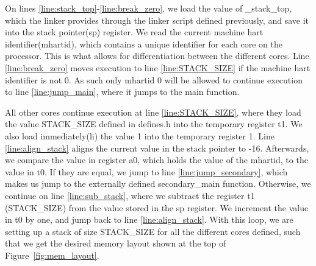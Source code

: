 On lines \ref{line:stack_top}-\ref{line:break_zero}, we load the value of
\_stack\_top, which the linker provides through the linker script defined
previously, and save it into the stack pointer(sp) register. We read the current
machine hart identifier(mhartid), which contains a unique identifier for each
core on the processor. This is what allows for differentiation between the
different cores. Line \ref{line:break_zero} moves execution to line
\ref{line:STACK_SIZE} if the machine hart identifier is not 0. As such only
mhartid 0 will be allowed to continue execution to line \ref{line:jump_main},
where it jumps to the main function.

All other cores continue execution at line \ref{line:STACK_SIZE}, where they
load the value STACK\_SIZE defined in defines.h into the temporary register t1.
We also load immediately(li) the value 1 into the temporary register 1. Line
\ref{line:align_stack} aligns the current value in the stack pointer to -16.
Afterwards, we compare the value in register a0, which holds the value of the
mhartid, to the value in t0. If they are equal, we jump to line
\ref{line:jump_secondary}, which makes us jump to the externally defined
secondary\_main function. Otherwise, we continue on line \ref{line:sub_stack},
where we subtract the register t1 (STACK\_SIZE) from the value stored in the sp
register. We increment the value in t0 by one, and jump back to line
\ref{line:align_stack}. With this loop, we are setting up a stack of size
STACK\_SIZE for all the different cores defined, such that we get the desired
memory layout shown at the top of Figure~\ref{fig:mem_layout}.

